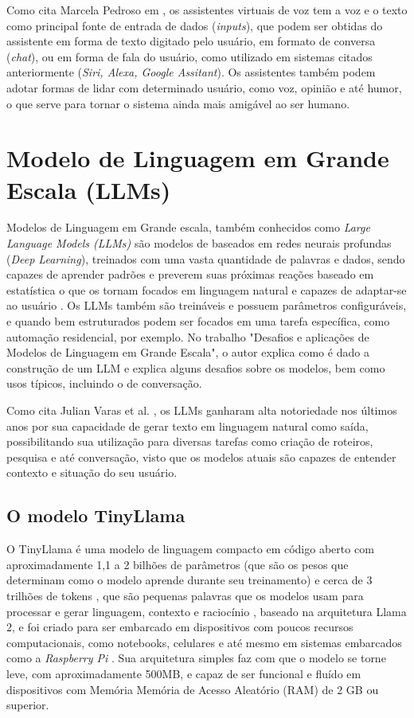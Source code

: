 Como cita Marcela Pedroso em \cite{maues2019dissertacao}, os assistentes virtuais de voz tem a voz e o texto como principal fonte de entrada de dados (\textit{inputs}), que podem ser obtidas do assistente em forma de texto digitado pelo usuário, em formato de conversa (\textit{chat}), ou em forma de fala do usuário, como utilizado em sistemas citados anteriormente (\textit{Siri, Alexa, Google Assitant}). Os assistentes também podem adotar formas de lidar com determinado usuário, como voz, opinião e até humor, o que serve para tornar o sistema ainda mais amigável ao ser humano.


\section{Modelo de Linguagem em Grande Escala (LLMs)}
Modelos de Linguagem em Grande escala, também conhecidos como \textit{Large Language Models (LLMs)} são modelos de  baseados em redes neurais profundas (\textit{Deep Learning}), treinados com uma vasta quantidade de palavras e dados, sendo capazes de aprender padrões e preverem suas próximas reações baseado em estatística o que os tornam focados em linguagem natural e capazes de adaptar-se ao usuário \cite{ibm_llm}. Os LLMs também são treináveis e possuem parâmetros configuráveis, e quando bem estruturados podem ser focados em uma tarefa específica, como automação residencial, por exemplo. No trabalho "Desafios e aplicações de Modelos de Linguagem em Grande Escala"\cite{kaddour2023llm}, o autor explica como é dado a construção de um LLM e explica alguns desafios sobre os modelos, bem como usos típicos, incluindo o de conversação.

Como cita Julian Varas et al. \cite{varas2023llm}, os LLMs ganharam alta notoriedade nos últimos anos por sua capacidade de gerar texto em linguagem natural como saída, possibilitando sua utilização para diversas tarefas como criação de roteiros, pesquisa e até conversação, visto que os modelos atuais são capazes de entender contexto e situação do seu usuário.



\subsection{O modelo TinyLlama}
O TinyLlama é uma modelo de linguagem compacto em código aberto com aproximadamente 1,1 a 2 bilhões de parâmetros (que são os pesos que determinam como o modelo aprende durante seu treinamento) e cerca de 3 trilhões de tokens , que são pequenas palavras que os modelos usam para processar e gerar linguagem, contexto e raciocínio \cite{Nvidia_tokens}, baseado na arquitetura Llama 2, e foi criado para ser embarcado em dispositivos com poucos recursos computacionais, como notebooks, celulares e até mesmo em sistemas embarcados como a \textit{Raspberry Pi} \cite{tinyllama2023}. Sua arquitetura simples faz com que o modelo se torne leve, com aproximadamente 500MB, e capaz de ser funcional e fluído em dispositivos com Memória Memória de Acesso Aleatório (RAM) de 2 GB ou superior. 

